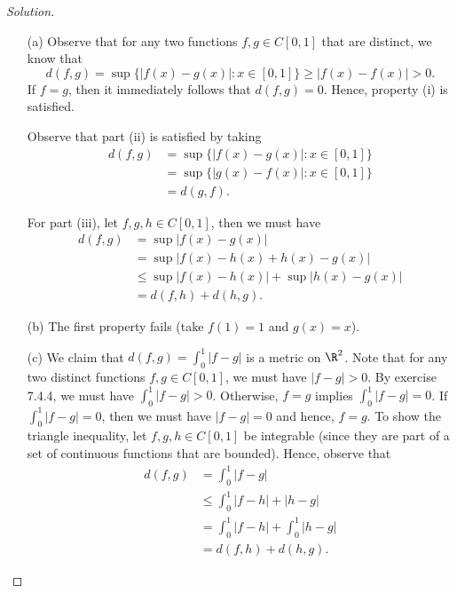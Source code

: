 \begin{proof}[Solution]
\begin{enumerate}
    \item[(a)] Observe that for any two functions \( f, g \in C[0,1] \) that are distinct, we know that 
        \[  d(f,g) = \sup \{ | f(x) - g(x)  |: x \in [0,1]  \} \geq | f(x) - f(x)  | > 0. \]
        If \( f = g  \), then it immediately follows that \( d(f,g) = 0  \). Hence, property (i) is satisfied.  

        Observe that part (ii) is satisfied by taking 
        \begin{align*}  d(f,g) &= \sup \{ | f(x) - g(x)  | : x \in [0,1] \} \\ &= \sup \{ | g(x) - f(x)  | : x \in [0,1] \} \\  &= d(g,f). \end{align*}

        For part (iii), let \( f,g,h \in C[0,1] \), then we must have 
        \begin{align*}
            d(f,g) &= \sup | f(x) - g(x) |  \\
                   &= \sup | f(x) - h(x) + h(x) - g(x) | \\
                   &\leq \sup | f(x) - h(x)  | + \sup | h(x) - g(x) | \\
                   &= d(f,h) + d(h,g).
        \end{align*}
    \item[(b)] The first property fails (take \( f(1) = 1  \) and \( g(x) = x  \)).
    \item[(c)] We claim that \( d(f,g) = \int_{ 0 }^{ 1 } | f - g  |     \) is a metric on \( \R^{2} \).    Note that for any two distinct functions \( f,g \in C[0,1]  \), we must have \( | f -g  | > 0  \). By exercise 7.4.4, we must have \( \int_{ 0 }^{ 1 }  | f - g  |   > 0  \). Otherwise, \( f = g  \) implies \( \int_{ 0 }^{ 1 }  | f - g  |  = 0  \). If \( \int_{ 0 }^{ 1 }  | f -g  |  =0  \), then we must have \( | f -g  | = 0  \) and hence, \( f = g  \). To show the triangle inequality, let \( f,g,h \in C[0,1] \) be integrable (since they are part of a set of continuous functions that are bounded). Hence, observe that 
        \begin{align*}
            d(f,g) &= \int_{ 0 }^{ 1 } | f -g  |    \\
                   &\leq \int_{ 0 }^{ 1 }  | f- h  |  + | h - g  |  \\
                   &= \int_{ 0 }^{ 1 } | f -h  | + \int_{ 0 }^{ 1 } | h - g  |  \\
                   &= d(f,h)  + d(h,g).
        \end{align*}
\end{enumerate}
\end{proof}

